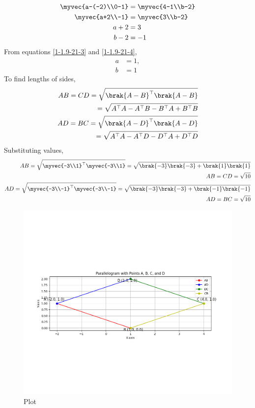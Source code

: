 \documentclass[journal]{IEEEtran}
\begin{document}
 \begin{align}
\myvec{a-(-2)\\0-1}&=\myvec{4-1\\b-2}\label{1-1.9-21-1}\\
\myvec{a+2\\-1}&=\myvec{3\\b-2}\label{1-1.9-21-2}\\
a+2&=3\label{1-1.9-21-3}\\
b-2&=-1\label{1-1.9-21-4}
\end{align}
 From equations \eqref{1-1.9-21-3} and \eqref{1-1.9-21-4}, 
\begin{align}
a&=1,\\
b&=1
\end{align}
To find lengths of sides,
\begin{align}
AB=CD=\sqrt{\brak{A-B}^\top\brak{A-B}}\\
=\sqrt{A^\top A-A^\top B -B^\top A+B^\top B }\label{1-1.9-21-5}\\
AD=BC=\sqrt{\brak{A-D}^\top\brak{A-D}}\\
=\sqrt{A^\top A-A^\top D -D^\top A+D^\top D }\label{1-1.9-21-6}\\
\end{align}
Substituting values,
\begin{align}
AB=\sqrt{\myvec{-3\\1}^\top \myvec{-3\\1}}=\sqrt{\brak{-3}\brak{-3}+\brak{1}\brak{1}}\\
AB=CD=\sqrt{10}\label{1-1.9-21-7}\\
AD=\sqrt{\myvec{-3\\-1}^\top \myvec{-3\\-1}}=\sqrt{\brak{-3}\brak{-3}+\brak{-1}\brak{-1}}\\
AD=BC=\sqrt{10}\label{1-1.9-21-8}
\end{align}
\begin{figure}[h!]
   \centering
   \includegraphics[width=1.1\linewidth]{Figs/Figure1.png}
   \caption{Plot}
   \label{1-1.9-21-fig-1}
\end{figure}
\end{document}

